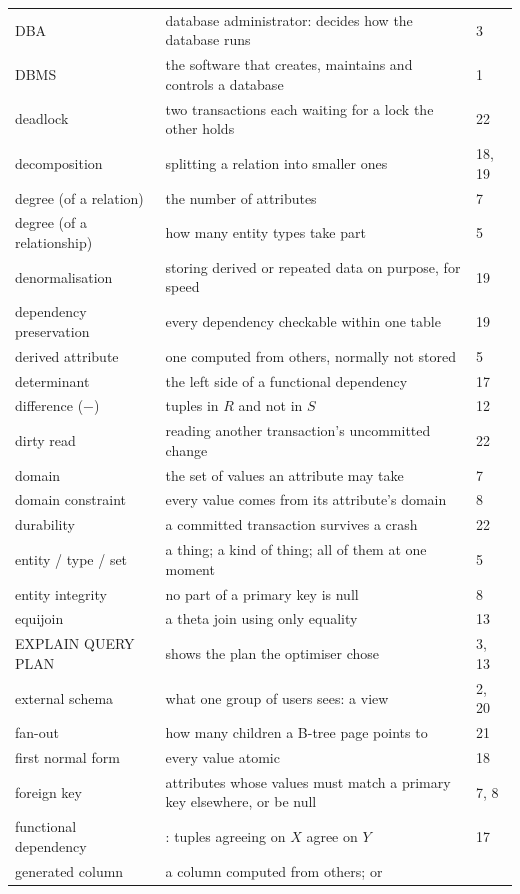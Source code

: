 \begin{longtable}{@{}L{3.9cm}L{8.9cm}R{1.2cm}@{}}
DBA & database administrator: decides how the database runs & 3 \\
DBMS & the software that creates, maintains and controls a database & 1 \\
deadlock & two transactions each waiting for a lock the other holds & 22 \\
decomposition & splitting a relation into smaller ones & 18, 19 \\
degree (of a relation) & the number of attributes & 7 \\
degree (of a relationship) & how many entity types take part & 5 \\
denormalisation & storing derived or repeated data on purpose, for speed & 19 \\
dependency preservation & every dependency checkable within one table & 19 \\
derived attribute & one computed from others, normally not stored & 5 \\
determinant & the left side of a functional dependency & 17 \\
difference ($-$) & tuples in $R$ and not in $S$ & 12 \\
dirty read & reading another transaction's uncommitted change & 22 \\
domain & the set of values an attribute may take & 7 \\
domain constraint & every value comes from its attribute's domain & 8 \\
durability & a committed transaction survives a crash & 22 \\
entity / type / set & a thing; a kind of thing; all of them at one moment & 5 \\
entity integrity & no part of a primary key is null & 8 \\
equijoin & a theta join using only equality & 13 \\
EXPLAIN QUERY PLAN & shows the plan the optimiser chose & 3, 13 \\
external schema & what one group of users sees: a view & 2, 20 \\
fan-out & how many children a B-tree page points to & 21 \\
first normal form & every value atomic & 18 \\
foreign key & attributes whose values must match a primary key elsewhere, or be
  null & 7, 8 \\
functional dependency & : tuples agreeing on $X$ agree on $Y$ & 17 \\
generated column & a column computed from others;  or

\end{longtable}
